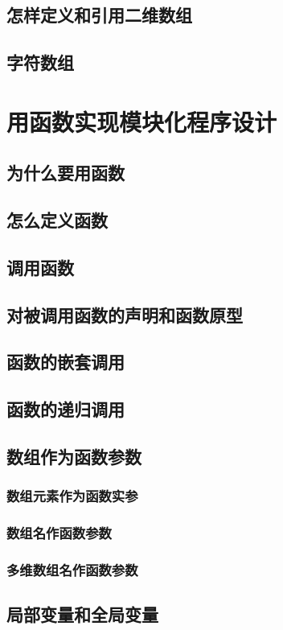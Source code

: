 \section{怎样定义和引用二维数组}
\section{字符数组}


\chapter{用函数实现模块化程序设计}
\section{为什么要用函数}
\section{怎么定义函数}
\section{调用函数}
\section{对被调用函数的声明和函数原型}
\section{函数的嵌套调用}
\section{函数的递归调用}
\section{数组作为函数参数}
\subsection{数组元素作为函数实参}
\subsection{数组名作函数参数}
\subsection{多维数组名作函数参数}
\section{局部变量和全局变量}
